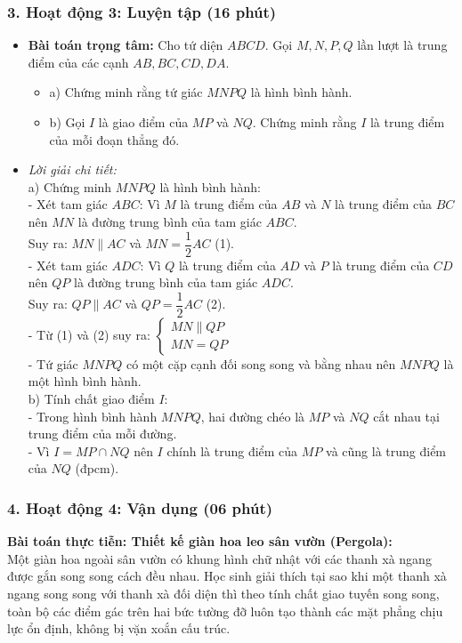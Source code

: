 \documentclass[12pt, a4paper]{article}
\begin{document}
\subsubsection*{3. Hoạt động 3: Luyện tập (16 phút)}
\begin{itemize}
    \item \textbf{Bài toán trọng tâm:} Cho tứ diện $ABCD$. Gọi $M, N, P, Q$ lần lượt là trung điểm của các cạnh $AB, BC, CD, DA$.
    \begin{itemize}
        \item a) Chứng minh rằng tứ giác $MNPQ$ là hình bình hành.
        \item b) Gọi $I$ là giao điểm của $MP$ và $NQ$. Chứng minh rằng $I$ là trung điểm của mỗi đoạn thẳng đó.
    \end{itemize}
    \item \textit{Lời giải chi tiết:}\\
    a) Chứng minh $MNPQ$ là hình bình hành:\\
    - Xét tam giác $ABC$: Vì $M$ là trung điểm của $AB$ và $N$ là trung điểm của $BC$ nên $MN$ là đường trung bình của tam giác $ABC$.\\
    Suy ra: $MN \parallel AC$ và $MN = \dfrac{1}{2}AC$ (1).\\
    - Xét tam giác $ADC$: Vì $Q$ là trung điểm của $AD$ và $P$ là trung điểm của $CD$ nên $QP$ là đường trung bình của tam giác $ADC$.\\
    Suy ra: $QP \parallel AC$ và $QP = \dfrac{1}{2}AC$ (2).\\
    - Từ (1) và (2) suy ra: $\begin{cases} MN \parallel QP \\ MN = QP \end{cases}$\\
    - Tứ giác $MNPQ$ có một cặp cạnh đối song song và bằng nhau nên $MNPQ$ là một hình bình hành.\\
    b) Tính chất giao điểm $I$:\\
    - Trong hình bình hành $MNPQ$, hai đường chéo là $MP$ và $NQ$ cắt nhau tại trung điểm của mỗi đường.\\
    - Vì $I = MP \cap NQ$ nên $I$ chính là trung điểm của $MP$ và cũng là trung điểm của $NQ$ (đpcm).
\end{itemize}

\subsubsection*{4. Hoạt động 4: Vận dụng (06 phút)}
\textbf{Bài toán thực tiễn: Thiết kế giàn hoa leo sân vườn (Pergola):}\\
Một giàn hoa ngoài sân vườn có khung hình chữ nhật với các thanh xà ngang được gắn song song cách đều nhau. Học sinh giải thích tại sao khi một thanh xà ngang song song với thanh xà đối diện thì theo tính chất giao tuyến song song, toàn bộ các điểm gác trên hai bức tường đỡ luôn tạo thành các mặt phẳng chịu lực ổn định, không bị vặn xoắn cấu trúc.
\end{document}
